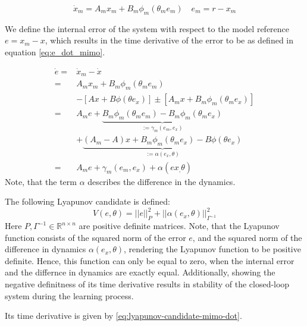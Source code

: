\begin{equation}
 \dot x_m = A_mx_m + B_m\phi_m(\theta_m e_m) \quad e_m = r-x_m
    \label{eq:mimo-ref}
\end{equation}

We define the internal error of the system with respect to the model reference $e=x_m-x$, which results in the time derivative of the error to be as defined in equation \eqref{eq:e_dot_mimo}. 

\begin{equation}
    \begin{aligned}
 \dot e  = & \dot x_m - \dot x \\
         = &  A_mx_m + B_m\phi_m(\theta_m e_m) \\ 
        & - \left[Ax + B\phi(\theta e_x)\right] \pm \left[A_mx + B_m\phi_m(\theta_m e_x)\right] \\
         = & A_m e + \underbrace{B_m\phi_m(\theta_m e_m) - B_m\phi_m(\theta_m e_x)}_{:=\gamma_m(e_m,e_x)} \\
        & + \underbrace{(A_m-A)x + B_m\phi_m(\theta_m e_x) - B\phi(\theta e_x)}_{:=\alpha(e_x,\theta)}\\
        = & A_m e + \gamma_m(e_m,e_x) + \alpha(ex_, \theta)
    \end{aligned}
    \label{eq:e_dot_mimo}
\end{equation}
Note, that the term $\alpha$ describes the difference in the dynamics.

The following Lyapunov candidate is defined:
\begin{equation}
    V(e,\theta) = ||e||_P^2 + ||\alpha(e_x,\theta)||_{\Gamma^{-1}}^2
    \label{eq:lyapunov-candidate-mimo}
\end{equation}
Here $P,\Gamma^{-1}\in\mathbb{R}^{n\times n}$ are positive definite matrices. Note, that the Lyapunov function consists of the squared norm of the error $e$, and the squared norm of the difference in dynamics $\alpha(e_x,\theta)$, rendering the Lyapunov function to be positive definite. Hence, this function can only be equal to zero, when the internal error and the differnce in dynamics are exactly equal. Additionally, showing the negative definitness of its time derivative results in stability of the closed-loop system during the learning process.

Its time derivative is given by \eqref{eq:lyapunov-candidate-mimo-dot}.

